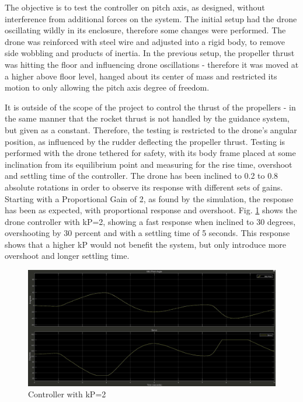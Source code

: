 The objective is to test the controller on pitch axis, as designed, without interference from additional forces on the system. The initial setup had the drone oscillating wildly in its enclosure, therefore some changes were performed. 
The drone was reinforced with steel wire and adjusted into a rigid body, to remove side wobbling and products of inertia. 
In the previous setup, the propeller thrust was hitting the floor and influencing drone oscillations - therefore it was moved at a higher above floor level, hanged about its  center of mass and  restricted its motion to only allowing the pitch axis degree of freedom. 

It is outside of the scope of the project to control the thrust of the propellers - in the same manner that the rocket thrust is not handled by the guidance system, but given as a constant. 
Therefore, the testing is restricted to the drone's angular position, as influenced by the rudder deflecting the propeller thrust. Testing is performed with the drone tethered for safety, with its body frame placed at some inclination from its equilibrium point and measuring for the rise time, overshoot and settling time of the controller. 
The drone has been inclined to 0.2 to 0.8 absolute rotations in order to observe its response with different sets of gains.
Starting with a Proportional Gain of 2, as found by the simulation, the response has been as expected, with proportional response and overshoot.
Fig. \ref{fig:Controller with kP=2} shows the drone controller with kP=2, showing a fast response when inclined to 30 degrees, overshooting by 30 percent and with a settling time of 5 seconds. This response shows that a higher kP would not benefit the system, but only introduce more overshoot and longer settling time. 


\begin{figure}[H]
    \centering
    \includegraphics[scale=0.25]{graphics/Control/p2_Moment(2).jpg}
    \caption{Controller with kP=2}
     \label{fig:Controller with kP=2}
\end{figure} 

